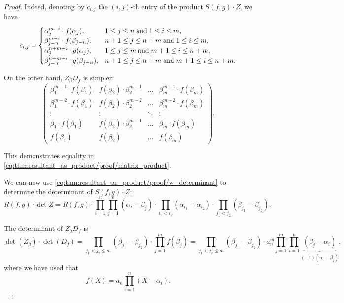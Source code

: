 \begin{proof}
  Indeed, denoting by \( c_{i,j} \) the \( (i, j) \)-th entry of the product \( S(f, g) \cdot Z \), we have
  \begin{equation*}
    c_{i,j} = \begin{cases}
      \alpha_j^{m-i} \cdot f(\alpha_j),         &1 \leq j \leq n \T{and} 1 \leq i \leq m, \\
      \beta_{j-n}^{m-i} \cdot f(\beta_{j-n}),   &n + 1 \leq j \leq n + m \T{and} 1 \leq i \leq m, \\
      \alpha_j^{n+m-i} \cdot g(\alpha_j),       &1 \leq j \leq m \T{and} m + 1 \leq i \leq n + m, \\
      \beta_{j-n}^{n+m-i} \cdot g(\beta_{j-n}), &n + 1 \leq j \leq n + m \T{and} m + 1 \leq i \leq n + m.
    \end{cases}
  \end{equation*}

  On the other hand, \( Z_\beta D_f \) is simpler:
  \begin{equation*}
    \begin{pmatrix}
      \beta_1^{m-1} \cdot f(\beta_1) & f(\beta_2) \cdot \beta_2^{m-1} & \ldots & \beta_m^{m-1} \cdot f(\beta_m) \\
      \beta_1^{m-2} \cdot f(\beta_1) & f(\beta_2) \cdot \beta_2^{m-2} & \ldots & \beta_m^{m-2} \cdot f(\beta_m) \\
      \vdots                         & \vdots                         & \ddots & \vdots                         \\
      \beta_1 \cdot f(\beta_1)       & f(\beta_2) \cdot \beta_2^{m-1} & \ldots & \beta_m \cdot f(\beta_m)       \\
      f(\beta_1)                     & f(\beta_2)                     & \ldots & f(\beta_m)
    \end{pmatrix}.
  \end{equation*}

  This demonstrates equality in \eqref{eq:thm:resultant_as_product/proof/matrix_product}.

  We can now use \eqref{eq:thm:resultant_as_product/proof/w_determinant} to determine the determinant of \( S(f, g) \cdot Z \):
  \begin{equation*}
    R(f, g) \cdot \det Z
    =
    R(f, g) \cdot \prod_{i=1}^n \prod_{j=1}^n (\alpha_i - \beta_j) \cdot \prod_{i_1 < i_2} (\alpha_{i_1} - \alpha_{i_2}) \cdot \prod_{j_1 < j_2} (\beta_{j_1} - \beta_{j_2}).
  \end{equation*}

  The determinant of \( Z_\beta D_f \) is
  \begin{equation*}
    \det(Z_\beta) \cdot \det(D_f)
    =
    \prod_{j_1 < j_2 \leq m} (\beta_{j_1} - \beta_{j_2}) \cdot \prod_{j=1}^m f(\beta_j)
    =
    \prod_{j_1 < j_2 \leq m} (\beta_{j_1} - \beta_{j_2}) \cdot a_n^m \prod_{j=1}^m \prod_{i=1}^n \underbrace{(\beta_j - \alpha_i)}_{(-1)(\alpha_i - \beta_j)},
  \end{equation*}
  where we have used that
  \begin{equation*}
    f(X) = a_n \prod_{i=1}^n (X - \alpha_i).
  \end{equation*}


\end{proof}
